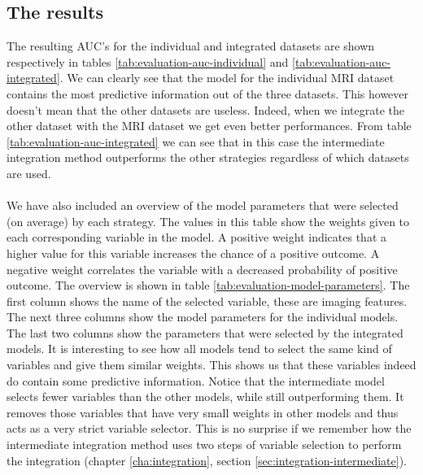 \subsection{The results}
The resulting AUC's for the individual and integrated datasets are shown respectively in tables \ref{tab:evaluation-auc-individual} and \ref{tab:evaluation-auc-integrated}. We can clearly see that the model for the individual MRI dataset contains the most predictive information out of the three datasets. This however doesn't mean that the other datasets are useless. Indeed, when we integrate the other dataset with the MRI dataset we get even better performances. From table \ref{tab:evaluation-auc-integrated} we can see that in this case the intermediate integration method outperforms the other strategies regardless of which datasets are used. \\ \\
We have also included an overview of the model parameters that were selected (on average) by each strategy. The values in this table show the weights given to each corresponding variable in the model. A positive weight indicates that a higher value for this variable increases the chance of a positive outcome. A negative weight correlates the variable with a decreased probability of positive outcome. The overview is shown in table \ref{tab:evaluation-model-parameters}. The first column shows the name of the selected variable, these are imaging features. The next three columns show the model parameters for the individual models. The last two columns show the parameters that were selected by the integrated models. It is interesting to see how all models tend to select the same kind of variables and give them similar weights. This shows us that these variables indeed do contain some predictive information. Notice that the intermediate model selects fewer variables than the other models, while still outperforming them. It removes those variables that have very small weights in other models and thus acts as a very strict variable selector. This is no surprise if we remember how the intermediate integration method uses two steps of variable selection to perform the integration (chapter \ref{cha:integration}, section \ref{sec:integration-intermediate}).

